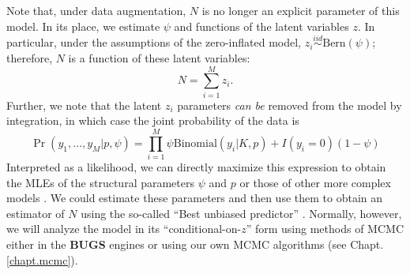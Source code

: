 Note that, under data augmentation, $N$ is no longer an explicit
parameter of this model. In its place, we estimate $\psi$ and
functions of the latent variables $z$. In particular, under the
assumptions of the zero-inflated model, $z_{i} \stackrel{iid}{\sim}
\mbox{Bern}(\psi)$; therefore, $N$ is a function of these latent
variables:
 \[
 N = \sum_{i=1}^{M} z_{i}.
\]
Further, we note that the latent $z_i$ parameters {\it can be} removed
 from
the model by integration, in which case the joint probability of the
data is
\begin{equation}
  \Pr(y_1, \ldots, y_M | p, \psi) = \prod_{i=1}^M  \psi \mathrm{Binomial}(y_i | K, p) +  I(y_i=0) (1-\psi)
\end{equation}
Interpreted as a likelihood, we can directly maximize this expression
to obtain the MLEs of the structural parameters $\psi$ and $p$ or
those of other more complex models \citep[e.g., see][]{royle:2006}. We
could estimate these parameters and then use them to obtain an
estimator of $N$ using the so-called ``Best unbiased predictor''
\citep[see][]{royle_dorazio:2012}. Normally, however, we will analyze
the model in its ``conditional-on-$z$'' form using methods of MCMC
either in the {\bf BUGS} engines or using our own MCMC algorithms (see
Chapt. \ref{chapt.mcmc}).

